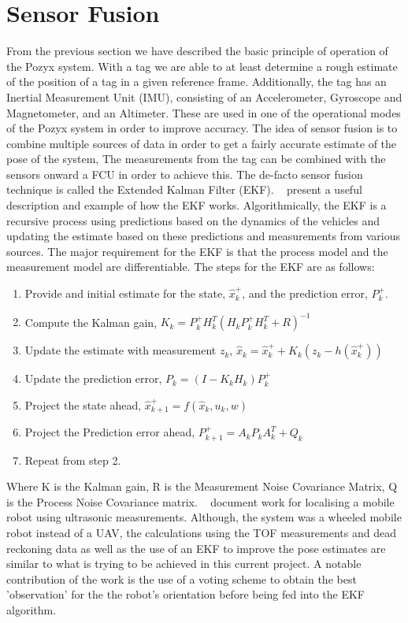 \section{Sensor Fusion}\label{sec:sensor_fusion}
From the previous section we have described the basic principle of operation of the Pozyx system.
With a tag we are able to at least determine a rough estimate of the position of a tag in a given reference frame.
Additionally, the tag has an Inertial Measurement Unit (IMU), consisting of an Accelerometer, Gyroscope and Magnetometer, and an Altimeter.
These are used in one of the operational modes of the Pozyx system in order to improve accuracy.
The idea of sensor fusion is to combine multiple sources of data in order to get a fairly accurate estimate of the pose of the system,
The measurements from the tag can be combined with the sensors onward a FCU in order to achieve this.
The de-facto sensor fusion technique is called the Extended Kalman Filter (EKF).
~\citet{simpleekf} present a useful description and example of how the EKF works.
Algorithmically, the EKF is a recursive process using predictions based on the dynamics of the vehicles and updating the estimate based on these predictions and measurements from various sources.
The major requirement for the EKF is that the process model and the measurement model are differentiable.
The steps for the EKF are as follows:
\begin{enumerate}
    \item Provide and initial estimate for the state, $\hat{x}^+_k$, and the prediction error, $P^+_k$.
    \item Compute the Kalman gain, $K_k = P^+_{k}H_k^T(H_k P^+_{k}H_k^T + R)^{-1}$
    \item Update the estimate with measurement $z_k$, $\hat{x}_k=\hat{x}^+_k + K_k(z_k - h(\hat{x}^+_k))$
    \item Update the prediction error, $P_k = (I - K_k H_k)P^+_{k}$
    \item Project the state ahead, $\hat{x}^+_{k+1} = f(\hat{x}_k, u_k, w)$
    \item Project the Prediction error ahead, $P^+_{k+1} = A_k P_k A_k^T + Q_k$
    \item Repeat from step 2.
\end{enumerate}
Where K is the Kalman gain, R is the Measurement Noise Covariance Matrix, Q is the Process Noise Covariance matrix.
~\citet{tsai1998localization} document work for localising a mobile robot using ultrasonic measurements.
Although, the system was a wheeled mobile robot instead of a UAV, the calculations using the TOF measurements and dead reckoning data as well as the use of an EKF to improve the pose estimates are similar to what is trying to be achieved in this current project.
A notable contribution of the work is the use of a voting scheme to obtain the best 'observation' for the the robot's orientation before being fed into the EKF algorithm.


